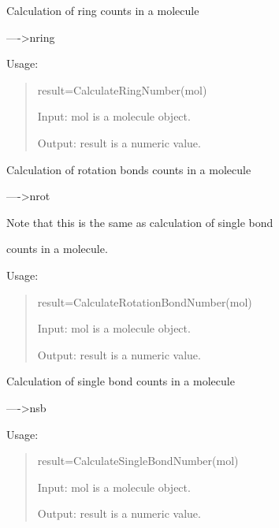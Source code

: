 \documentclass[letterpaper,10pt,english]{sphinxmanual}
\begin{document}

\begin{fulllineitems}
\label{reference/constitution:constitution.CalculateRingNumber}
Calculation of ring counts in a molecule

----\textgreater{}nring

Usage:
\begin{quote}

result=CalculateRingNumber(mol)

Input: mol is a molecule object.

Output: result is a numeric value.
\end{quote}

\end{fulllineitems}


\begin{fulllineitems}
\label{reference/constitution:constitution.CalculateRotationBondNumber}
Calculation of rotation bonds counts in a molecule

----\textgreater{}nrot

Note that this is the same as calculation of single bond

counts in a molecule.

Usage:
\begin{quote}

result=CalculateRotationBondNumber(mol)

Input: mol is a molecule object.

Output: result is a numeric value.
\end{quote}

\end{fulllineitems}


\begin{fulllineitems}
\label{reference/constitution:constitution.CalculateSingleBondNumber}
Calculation of single bond counts in a molecule

----\textgreater{}nsb

Usage:
\begin{quote}

result=CalculateSingleBondNumber(mol)

Input: mol is a molecule object.

Output: result is a numeric value.
\end{quote}

\end{fulllineitems}
\end{document}
